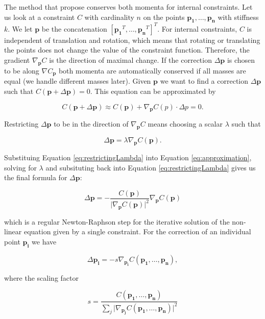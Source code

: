 \documentclass[sigplan,screen,nonacm]{acmart}
\renewcommand{\b}{\boldsymbol}
\begin{document}
The method that \citet{MullerPBD} propose conserves both momenta for internal
constraints. Let us look at a constraint $C$ with cardinality $n$ on the points
$\b{p_1}, \ldots, \b{p_n}$ with stiffness $k$. We let $\b{p}$ be the
concatenation $[\b{p_1}^T, \ldots, \b{p_n}^T]^T$. For internal constraints, $C$ is
independent of translation and rotation, which means that rotating or
translating the points does not change the value of the constraint function.
Therefore, the gradient $\nabla_{\b{p}} C$ is the direction of maximal change. If the
correction $\Delta \b{p}$ is chosen to be along $\nabla C_{\b{p}}$ both momenta
are automatically conserved if all masses are equal (we handle different masses
later). Given $\b{p}$ we want to find a correction $\Delta \b{p}$ such that
$C(\b{p}+\Delta\b{p})=0$. This equation can be approximated by

\begin{equation}
    C(\b{p}+\Delta\b{p}) \approx C(\b{p}) + \nabla_{\b{p}} C(p)\cdot\Delta
    p = 0.
    \label{eq:approximation}
\end{equation}

Restricting $\Delta \b{p}$ to be in the direction of $\nabla_{\b{p}}C$ means
choosing a scalar $\lambda$ such that

\begin{equation}
    \Delta{\b{p}} = \lambda \nabla_{\b{p}}C(\b{p}).
    \label{eq:restrictingLambda}
\end{equation}

Substituing Equation \ref{eq:restrictingLambda} into Equation
\ref{eq:approximation}, solving for $\lambda$ and subsituting back into Equation
\ref{eq:restrictingLambda} gives us the final formula for $\Delta\b{p}$:

\begin{equation}
    \Delta \b{p} = - \frac{C(\b{p})}{\lvert \nabla_{\b{p}} C(\b{p})\rvert^2}
    \nabla_{\b{p}}C(\b{p})
\end{equation}

which is a regular Newton-Raphson step for the iterative solution of the
non-linear equation given by a single constraint. For the correction of an
individual point $\b{p_i}$ we have

\begin{equation}
    \Delta \b{p_i} = -s\nabla_{\b{p_i}}C(\b{p_1},\ldots,\b{p_n}),
\end{equation}

where the scaling factor

\begin{equation}
    s = \frac{C(\b{p_1},\ldots,\b{p_n})}{
        \sum\limits_{j} \lvert\nabla_{\b{p_j}}C(\b{p_1},\ldots,\b{p_n})\rvert^2
    }
\end{equation}
\end{document}
